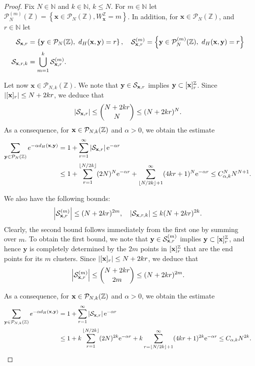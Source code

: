 \documentclass[12pt, a4paper,reqno]{amsart}
\numberwithin{equation}{section}
\newcommand\N{\mathbb N}
\newcommand\Z{\mathbb Z}
\newcommand\x{\mathbf{x}}
\newcommand\y{\mathbf{y}}
\newcommand\e{\mathrm{e}}
\newcommand\cP{\mathcal{P}}
\newcommand\be{\begin{equation}\begin{aligned}}
\newcommand\ee{\end{aligned}\end{equation}}
\newcommand{\abs}[1]{\left\lvert #1 \right\rvert}
\newcommand{\set}[1]{\left\{ #1 \right\}}
\newcommand{\fl}[1]{\left\lfloor #1 \right\rfloor}
\newcommand{\up}[1]{^{\left(#1\right)}}
\begin{document}
\begin{proof}
Fix $N \in \N$ and $k\in \N$, $k\le N$.
For $m \in \N$ let $\cP_N\up{m}(\Z)= \set{\x \in \cP_N(\Z), W_\x^\Z= m}$.    In addition, for $\x\in \cP_{N}(\Z)$, and  $r\in \N$ let 
 \be  
 \mathcal S_{{\bf x},r}& = \set{{\bf y}\in \cP_{N}(\Z), \ d_H({\bf x},{\bf y})=r},\quad \mathcal S_{{\bf x},r}\up{m} = \set{{\bf y}\in\cP_N\up{m}(\Z), \ d_H({\bf x},{\bf y})=r}\\
 \mathcal S_{{\bf x},r,k}& =  \bigcup_{m=1}^k \mathcal S_{{\bf x},r}\up{m}.
 \ee

Let now   $\x\in \cP_{N,k}(\Z)$.   We note that ${\bf y}\in\mathcal S_{{\bf x},r}$  implies ${\bf y}\subset  [{\bf x}]^\Z_r$. Since  
 $\abs{[{\bf x}]_r}\le N+ 2kr$, we deduce that  
 \be
 \abs{\mathcal S_{{\bf x},r}}\le \binom{ N+ 2kr}{N}\le (N+ 2kr)^{N}.
 \ee
As a consequence, for ${\bf x}\in  \cP_{N,k}(\Z)$ and  $\alpha >0$, we obtain the estimate
\be
\sum_{{\bf y}\in \cP_{N}(\Z)}e^{-\alpha d_H({\bf x},{\bf y})}&=1+\sum_{r=1}^\infty\abs{\mathcal S_{{\bf x},r}}\e^{-\alpha r}\\
&\le 1+{\sum_{r=1}^{\lfloor N/2{k}\rfloor}(2N)^{N}\e^{-\alpha r}+  \sum^\infty_{\fl{N/2{k}}+1}}  (4{k}r+1)^{N}\e^{-\alpha r}\le C_{\alpha,k}^N N^{N+1}.
\ee


We also have the  following bounds: 
\be
\abs{\mathcal S_{{\bf x},r}\up{m}}\le (N+2{k} r)^{2m},\quad \abs{\mathcal S_{{\bf x},r,k}}\le {   k} (N+2{k} r)^{2k}.
\ee
Clearly, the second bound follows immediately from the first one by summing over $m$. To obtain the first bound, we 
note that ${\bf y}\in\mathcal S_{{\bf x},r}\up{m}$  implies ${\bf y}\subset  [{\bf x}]^\Z_r$,  and  hence $\y$ is completely determined by the   $2m$ points in $[{\bf x}]^\Z_r$ that are the end points for its $m$ clusters. Since  
 $\abs{[{\bf x}]_r}\le N+  2{k} r$, we deduce that  
 \be
 \abs{\mathcal S_{{\bf x},r}\up{m}}\le \binom{ N+2{k} r}{2m}\le (N+2{k} r)^{2m}.
 \ee
 
 


 As a consequence, for ${\bf x}\in  \cP_{N,k}(\Z)$ and  $\alpha >0$, we obtain the estimate
\be
\sum_{{\bf y}\in \cP_{N,k}(\Z)}e^{-\alpha d_H({\bf x},{\bf y})}&=1+\sum_{r=1}^\infty\abs{\mathcal S_{{\bf x},r}}\e^{-\alpha r}\\
&\le 1+k\sum_{r=1}^{\lfloor N/2{k}\rfloor}(2N)^{2k}\e^{-\alpha r}+ k \sum^\infty_{ r=\fl{N/2{k}}+1} (4{k}r+1)^{2k}\e^{-\alpha r}\le C_{\alpha,k} N^{2k}.
\ee
\end{proof}
\end{document}
